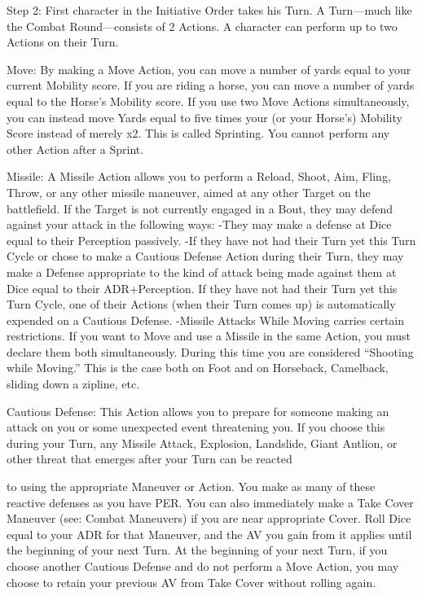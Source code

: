 \documentclass[oneside,11pt,english]{book}
\begin{document}
 

Step 2: First character in the Initiative Order takes his Turn. A Turn—much like the Combat 
Round—consists of 2 Actions. A character can perform up to two Actions on their Turn. 

 

Move: By making a Move Action, you can move a number of yards equal to your current 
Mobility score. If you are riding a horse, you can move a number of yards equal to the Horse’s 
Mobility score. If you use two Move Actions simultaneously, you can instead move Yards equal 
to five times your (or your Horse’s) Mobility Score instead of merely x2. This is called 
Sprinting. You cannot perform any other Action after a Sprint. 

 

Missile: A Missile Action allows you to perform a Reload, Shoot, Aim, Fling, Throw, or any 
other missile maneuver, aimed at any other Target on the battlefield. If the Target is not currently 
engaged in a Bout, they may defend against your attack in the following ways: 
-They may make a defense at Dice equal to their Perception passively. 
-If they have not had their Turn yet this Turn Cycle or chose to make a Cautious Defense Action 
during their Turn, they may make a Defense appropriate to the kind of attack being made against 
them at Dice equal to their ADR+Perception. If they have not had their Turn yet this Turn 
Cycle, one of their Actions (when their Turn comes up) is automatically expended on a Cautious 
Defense. 
-Missile Attacks While Moving carries certain restrictions. If you want to Move and use a 
Missile in the same Action, you must declare them both simultaneously. During this time you are 
considered “Shooting while Moving.” This is the case both on Foot and on Horseback, 
Camelback, sliding down a zipline, etc. 

 

 

Cautious Defense: This Action allows you to prepare for someone making an attack on you or 
some unexpected event threatening you. If you choose this during your Turn, any Missile Attack, 
Explosion, Landslide, Giant Antlion, or other threat that emerges after your Turn can be reacted 


to using the appropriate Maneuver or Action. You make as many of these reactive defenses as 
you have PER. You can also immediately make a Take Cover Maneuver (see: Combat 
Maneuvers) if you are near appropriate Cover. Roll Dice equal to your ADR for that Maneuver, 
and the AV you gain from it applies until the beginning of your next Turn. 
At the beginning of your next Turn, if you choose another Cautious Defense and do not perform 
a Move Action, you may choose to retain your previous AV from Take Cover without rolling 
again. 
\end{document}
